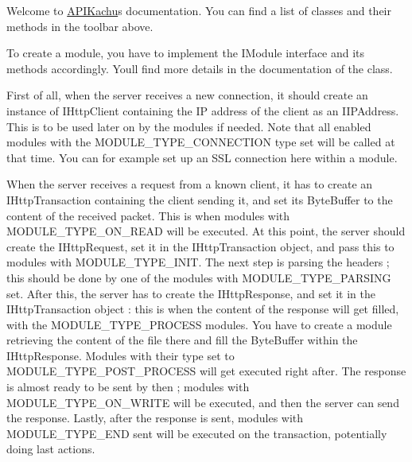 Welcome to \hyperlink{namespace_a_p_i_kachu}{A\+P\+I\+Kachu}\textquotesingle{}s documentation. You can find a list of classes and their methods in the toolbar above.

To create a module, you have to implement the I\+Module interface and its methods accordingly. You\textquotesingle{}ll find more details in the documentation of the class.

First of all, when the server receives a new connection, it should create an instance of I\+Http\+Client containing the IP address of the client as an I\+I\+P\+Address. This is to be used later on by the modules if needed. Note that all enabled modules with the M\+O\+D\+U\+L\+E\+\_\+\+T\+Y\+P\+E\+\_\+\+C\+O\+N\+N\+E\+C\+T\+I\+ON type set will be called at that time. You can for example set up an S\+SL connection here within a module.

When the server receives a request from a known client, it has to create an I\+Http\+Transaction containing the client sending it, and set its Byte\+Buffer to the content of the received packet. This is when modules with M\+O\+D\+U\+L\+E\+\_\+\+T\+Y\+P\+E\+\_\+\+O\+N\+\_\+\+R\+E\+AD will be executed. At this point, the server should create the I\+Http\+Request, set it in the I\+Http\+Transaction object, and pass this to modules with M\+O\+D\+U\+L\+E\+\_\+\+T\+Y\+P\+E\+\_\+\+I\+N\+IT. The next step is parsing the headers ; this should be done by one of the modules with M\+O\+D\+U\+L\+E\+\_\+\+T\+Y\+P\+E\+\_\+\+P\+A\+R\+S\+I\+NG set. After this, the server has to create the I\+Http\+Response, and set it in the I\+Http\+Transaction object \+: this is when the content of the response will get filled, with the M\+O\+D\+U\+L\+E\+\_\+\+T\+Y\+P\+E\+\_\+\+P\+R\+O\+C\+E\+SS modules. You have to create a module retrieving the content of the file there and fill the Byte\+Buffer within the I\+Http\+Response. Modules with their type set to M\+O\+D\+U\+L\+E\+\_\+\+T\+Y\+P\+E\+\_\+\+P\+O\+S\+T\+\_\+\+P\+R\+O\+C\+E\+SS will get executed right after. The response is almost ready to be sent by then ; modules with M\+O\+D\+U\+L\+E\+\_\+\+T\+Y\+P\+E\+\_\+\+O\+N\+\_\+\+W\+R\+I\+TE will be executed, and then the server can send the response. Lastly, after the response is sent, modules with M\+O\+D\+U\+L\+E\+\_\+\+T\+Y\+P\+E\+\_\+\+E\+ND sent will be executed on the transaction, potentially doing last actions.

